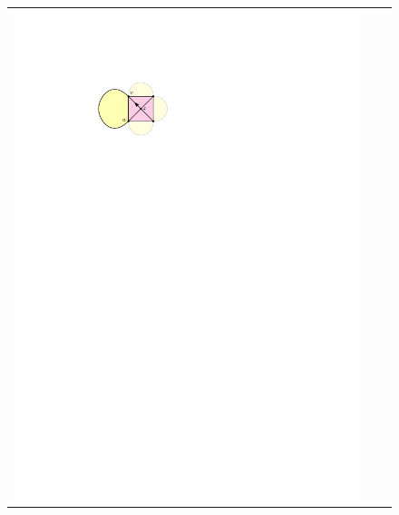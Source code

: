 \documentclass[a4paper,UKenglish,cleveref, autoref, thm-restate]{lipics-v2021}
\begin{document}
\begin{figure}
\begin{tabular}{ccc}
    \includegraphics[page=2]{figs/biconnected} &

\end{tabular}
\end{figure}
\end{document}

